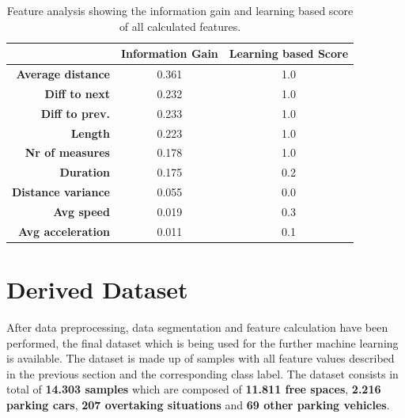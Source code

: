 \begin{table}


\centering
\bgroup
\def\arraystretch{1.4}
\begin{tabular}{| r || c | c |}
\hline
   & 
   \textbf{Information Gain} & 
   \textbf{Learning based Score} \\
\hline
  \textbf{Average distance} & 
   0.361 &
   1.0 \\
\hline
\textbf{Diff to next} & 
   0.232 &
   1.0 \\
\hline
\textbf{Diff to prev.} & 
   0.233 &
   1.0 \\
\hline
\textbf{Length} & 
   0.223 &
   1.0 \\
\hline
\textbf{Nr of measures} & 
   0.178 &
   1.0 \\
\hline
\textbf{Duration} & 
   0.175 &
   0.2 \\
\hline
\textbf{Distance variance} & 
   0.055 &
   0.0 \\
\hline
\textbf{Avg speed} & 
   0.019 &
   0.3 \\
\hline
\textbf{Avg acceleration} & 
   0.011 &
   0.1 \\
\hline


\end{tabular}
\egroup

\caption{Feature analysis showing the information gain and learning based score of all calculated features.}
\label{table:feature_analysis}
\end{table}















\section{Derived Dataset}
\label{sec:derived_dataset}

After data preprocessing, data segmentation and feature calculation have been performed, the final dataset which is being used for the further machine learning is available. The dataset is made up of samples with all feature values described in the previous section and the corresponding class label. The dataset consists in total of \textbf{14.303 samples} which are composed of \textbf{11.811 free spaces}, \textbf{2.216 parking cars}, \textbf{207 overtaking situations} and \textbf{69 other parking vehicles}. 









